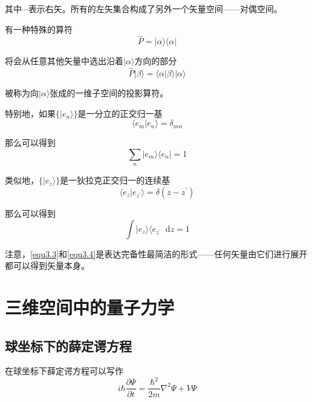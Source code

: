 \documentclass[UTF8]{ctexart}
\begin{document}
\noindent 其中$\cdots$表示右矢。所有的左矢集合构成了另外一个矢量空间——对偶空间。

    有一种特殊的算符
    \begin{equation}
        \hat{P} = | \alpha \rangle \langle \alpha |
    \end{equation}

\noindent 将会从任意其他矢量中选出沿着$| \alpha \rangle$方向的部分
\begin{equation}
    \hat{P}| \beta \rangle = \langle \alpha | \beta \rangle | \alpha \rangle
\end{equation}

\noindent 被称为向$| \alpha \rangle$张成的一维子空间的投影算符。

特别地，如果$\{| e_n \rangle\}$是一分立的正交归一基
\begin{equation}
    \langle e_m | e_n \rangle = \delta_{mn}
\end{equation}

\noindent 那么可以得到
\begin{equation}
    \sum_{n} | e_m \rangle \langle e_n | =1 \label{equ3.3}
\end{equation}

    类似地，$\{| e_z \rangle\}$是一狄拉克正交归一的连续基
    \begin{equation}
        \langle e_z | e_{z^{\prime}} \rangle = \delta(z-z^{\prime})
    \end{equation}

\noindent 那么可以得到
\begin{equation}
    \int | e_z \rangle \langle e_{z^{\prime}} \mathop{}\!\mathrm{d} z =1 \label{equ3.4}
\end{equation}

    注意，\autoref{equ3.3}和\autoref{equ3.4}是表达完备性最简洁的形式——任何矢量由它们进行展开都可以得到矢量本身。

    \section{三维空间中的量子力学}
    \subsection{球坐标下的薛定谔方程}
    在球坐标下薛定谔方程可以写作
    \begin{equation}
        i \hbar \frac{\partial \Psi}{\partial t} = \frac{\hbar^2}{2m} \nabla^2 \Psi + V \Psi 
    \end{equation}
    
\end{document}
